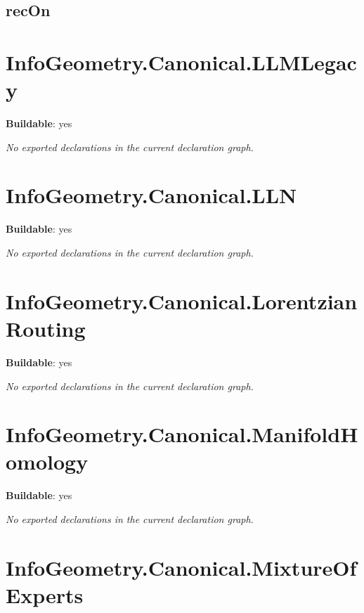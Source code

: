 \begin{theorem}[blueprint="infogeometry:canonical:kreinladder:informationladder:rec"]
\end{theorem}

\subsection*{recOn}

\begin{theorem}[blueprint="infogeometry:canonical:kreinladder:informationladder:recon"]
\end{theorem}

\section{InfoGeometry.Canonical.LLMLegacy}

\noindent\textbf{Buildable}: yes

\noindent\emph{No exported declarations in the current declaration graph.}

\section{InfoGeometry.Canonical.LLN}

\noindent\textbf{Buildable}: yes

\noindent\emph{No exported declarations in the current declaration graph.}

\section{InfoGeometry.Canonical.LorentzianRouting}

\noindent\textbf{Buildable}: yes

\noindent\emph{No exported declarations in the current declaration graph.}

\section{InfoGeometry.Canonical.ManifoldHomology}

\noindent\textbf{Buildable}: yes

\noindent\emph{No exported declarations in the current declaration graph.}

\section{InfoGeometry.Canonical.MixtureOfExperts}

